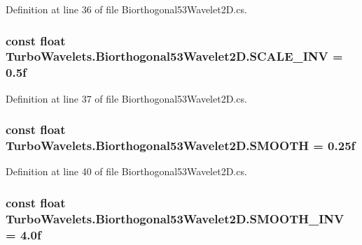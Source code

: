 \-Definition at line 36 of file \-Biorthogonal53\-Wavelet2\-D.\-cs.

\hypertarget{class_turbo_wavelets_1_1_biorthogonal53_wavelet2_d_a035bc7a8559c9e4eb476c6a1c1d8cc9a}{
\subsubsection[{\-S\-C\-A\-L\-E\-\_\-\-I\-N\-V}]{\setlength{\rightskip}{0pt plus 5cm}const float {\bf \-Turbo\-Wavelets.\-Biorthogonal53\-Wavelet2\-D.\-S\-C\-A\-L\-E\-\_\-\-I\-N\-V} = 0.\-5f}}\label{class_turbo_wavelets_1_1_biorthogonal53_wavelet2_d_a035bc7a8559c9e4eb476c6a1c1d8cc9a}


\-Definition at line 37 of file \-Biorthogonal53\-Wavelet2\-D.\-cs.

\hypertarget{class_turbo_wavelets_1_1_biorthogonal53_wavelet2_d_ac608d0d31583d5c06c6dd7ab41880cb6}{
\subsubsection[{\-S\-M\-O\-O\-T\-H}]{\setlength{\rightskip}{0pt plus 5cm}const float {\bf \-Turbo\-Wavelets.\-Biorthogonal53\-Wavelet2\-D.\-S\-M\-O\-O\-T\-H} = 0.\-25f}}\label{class_turbo_wavelets_1_1_biorthogonal53_wavelet2_d_ac608d0d31583d5c06c6dd7ab41880cb6}


\-Definition at line 40 of file \-Biorthogonal53\-Wavelet2\-D.\-cs.

\hypertarget{class_turbo_wavelets_1_1_biorthogonal53_wavelet2_d_aeb90da1672a5e2fd88863bf227ee6db9}{
\subsubsection[{\-S\-M\-O\-O\-T\-H\-\_\-\-I\-N\-V}]{\setlength{\rightskip}{0pt plus 5cm}const float {\bf \-Turbo\-Wavelets.\-Biorthogonal53\-Wavelet2\-D.\-S\-M\-O\-O\-T\-H\-\_\-\-I\-N\-V} = 4.\-0f}}\label{class_turbo_wavelets_1_1_biorthogonal53_wavelet2_d_aeb90da1672a5e2fd88863bf227ee6db9}


